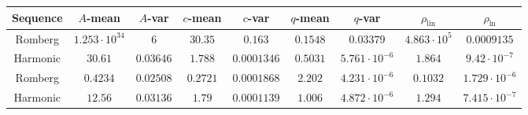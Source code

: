 \begin{table}[H]
    \centering
    \small
    \begin{tabular}{c||c|c|c|c|c|c|c|c}
Sequence & \(A\)-mean & \(A\)-var & \(c\)-mean & \(c\)-var & \(q\)-mean & \(q\)-var & \(\rho_{\operatorname{lin}}\) & \(\rho_{\ln}\)\\\hline
\rowcolor{red}
Romberg & \(1.253\cdot 10^{34}\) & \(6\) & \(30.35\) & \(0.163\) & \(0.1548\) & \(0.03379\) & \(4.863\cdot 10^5\) & \(0.0009135\) \\
\rowcolor{green}
Harmonic & \(30.61\) & \(0.03646\) & \(1.788\) & \(0.0001346\) & \(0.5031\) & \(5.761\cdot 10^{-6}\) & \(1.864\) & \(9.42\cdot 10^{-7}\) \\
\rowcolor{green}
Romberg & \(0.4234\) & \(0.02508\) & \(0.2721\) & \(0.0001868\) & \(2.202\) & \(4.231\cdot 10^{-6}\) & \(0.1032\) & \(1.729\cdot 10^{-6}\) \\
\rowcolor{green}
Harmonic & \(12.56\) & \(0.03136\) & \(1.79\) & \(0.0001139\) & \(1.006\) & \(4.872\cdot 10^{-6}\) & \(1.294\) & \(7.415\cdot 10^{-7}\) \\
    \end{tabular}
    \label{tab:my_label}
\end{table}

